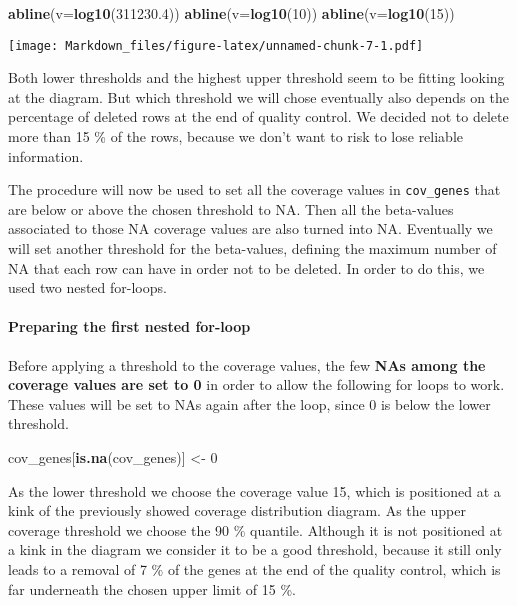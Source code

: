 \documentclass[]{article}
\newenvironment{Shaded}{\begin{snugshade}}{\end{snugshade}}
\newcommand{\KeywordTok}[1]{\textcolor[rgb]{0.13,0.29,0.53}{\textbf{#1}}}
\newcommand{\DataTypeTok}[1]{\textcolor[rgb]{0.13,0.29,0.53}{#1}}
\newcommand{\DecValTok}[1]{\textcolor[rgb]{0.00,0.00,0.81}{#1}}
\newcommand{\FloatTok}[1]{\textcolor[rgb]{0.00,0.00,0.81}{#1}}
\newcommand{\StringTok}[1]{\textcolor[rgb]{0.31,0.60,0.02}{#1}}
\newcommand{\NormalTok}[1]{#1}
\let\oldparagraph\paragraph
\renewcommand{\paragraph}[1]{\oldparagraph{#1}\mbox{}}
\begin{document}
\begin{Shaded}
\begin{Highlighting}[]
\KeywordTok{abline}\NormalTok{(}\DataTypeTok{v=}\KeywordTok{log10}\NormalTok{(}\FloatTok{311230.4}\NormalTok{))}
\KeywordTok{abline}\NormalTok{(}\DataTypeTok{v=}\KeywordTok{log10}\NormalTok{(}\DecValTok{10}\NormalTok{))}
\KeywordTok{abline}\NormalTok{(}\DataTypeTok{v=}\KeywordTok{log10}\NormalTok{(}\DecValTok{15}\NormalTok{))}
\end{Highlighting}
\end{Shaded}

\texttt{[image: Markdown\_files/figure-latex/unnamed-chunk-7-1.pdf]}

Both lower thresholds and the highest upper threshold seem to be fitting
looking at the diagram. But which threshold we will chose eventually
also depends on the percentage of deleted rows at the end of quality
control. We decided not to delete more than 15 \% of the rows, because
we don't want to risk to lose reliable information.

The procedure will now be used to set all the coverage values in
\texttt{cov\_genes} that are below or above the chosen threshold to NA.
Then all the beta-values associated to those NA coverage values are also
turned into NA. Eventually we will set another threshold for the
beta-values, defining the maximum number of NA that each row can have in
order not to be deleted. In order to do this, we used two nested
for-loops.

\paragraph{Preparing the first nested
for-loop}\label{preparing-the-first-nested-for-loop}

Before applying a threshold to the coverage values, the few \textbf{NAs
among the coverage values are set to 0} in order to allow the following
for loops to work. These values will be set to NAs again after the loop,
since 0 is below the lower threshold.

\begin{Shaded}
\begin{Highlighting}[]
\NormalTok{cov_genes[}\KeywordTok{is.na}\NormalTok{(cov_genes)] <-}\StringTok{ }\DecValTok{0}
\end{Highlighting}
\end{Shaded}

As the lower threshold we choose the coverage value 15, which is
positioned at a kink of the previously showed coverage distribution
diagram. As the upper coverage threshold we choose the 90 \% quantile.
Although it is not positioned at a kink in the diagram we consider it to
be a good threshold, because it still only leads to a removal of 7 \% of
the genes at the end of the quality control, which is far underneath the
chosen upper limit of 15 \%.
\end{document}
